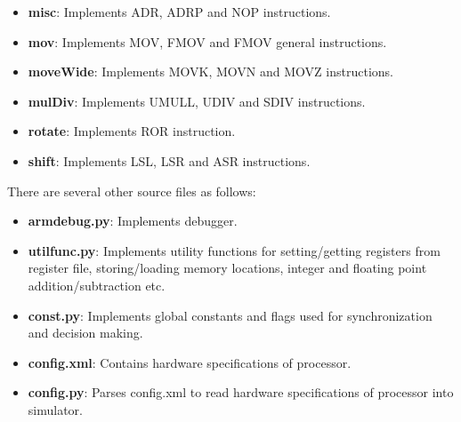 \documentclass[12pt]{report}
\begin{document}
\begin{itemize}
\begin{itemize}
\item{\textbf{misc}: Implements ADR, ADRP and NOP instructions.}
\item{\textbf{mov}: Implements MOV, FMOV and FMOV general instructions.}
\item{\textbf{moveWide}: Implements MOVK, MOVN and MOVZ instructions.}
\item{\textbf{mulDiv}: Implements UMULL, UDIV and SDIV instructions.}
\item{\textbf{rotate}: Implements ROR instruction.}
\item{\textbf{shift}: Implements LSL, LSR and ASR instructions.}
\end{itemize}
\end{itemize}

There are several other source files as follows:
\begin{itemize}
\item{\textbf{armdebug.py}: Implements debugger.}
\item{\textbf{utilfunc.py}: Implements utility functions for setting/getting registers from register file, storing/loading memory locations, integer and floating point addition/subtraction etc.}
\item{\textbf{const.py}: Implements global constants and flags used for synchronization and decision making.}
\item{\textbf{config.xml}: Contains hardware specifications of processor.}
\item{\textbf{config.py}: Parses config.xml to read hardware specifications of processor into simulator. }
\end{itemize}
\end{document}
